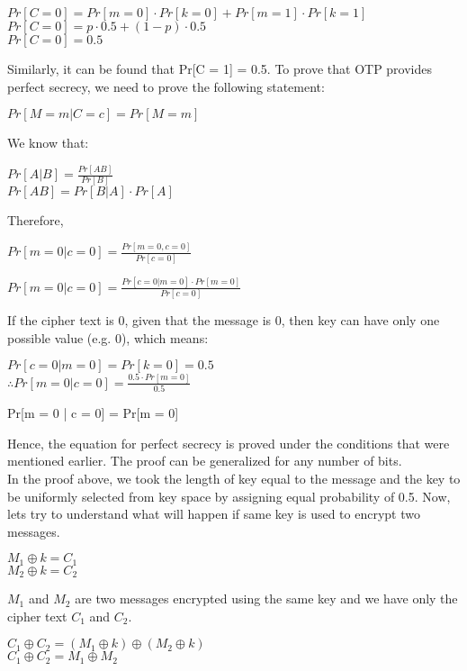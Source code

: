 \documentclass[11pt]{article}
\begin{document}
\begin{center}
    $Pr[C = 0] = Pr[m = 0] \cdot Pr[k = 0] + Pr[m = 1] \cdot Pr[k = 1]$\\
    $Pr[C = 0] = p \cdot 0.5 + (1 - p) \cdot 0.5$\\
    $Pr[C = 0] = 0.5$
\end{center}
Similarly, it can be found that Pr[C = 1] = 0.5. To prove that OTP provides perfect secrecy, we need to prove the following statement:
\begin{center}
    $Pr[M = m | C = c] = Pr[M = m]$
\end{center}
We know that:
\begin{center}
    $Pr[A|B] = \frac{Pr[AB]}{Pr[B]}$\\
    $Pr[AB] = Pr[B|A] \cdot Pr[A]$
\end{center}
Therefore, 
\begin{center}
    $Pr[m = 0 | c = 0] = \frac{Pr[m = 0, c = 0]}{Pr[c = 0]} $\\
\end{center}
\begin{center}
    $Pr[m = 0 | c = 0] = \frac{Pr[c = 0 | m = 0] \cdot Pr[m = 0]}{Pr[c = 0]} $
\end{center}
If the cipher text is 0, given that the message is 0, then key can have only one possible value (e.g. 0), which means:
\begin{center}
    $Pr[c = 0 | m = 0] = Pr[k = 0] = 0.5$\\
    $\therefore Pr[m = 0 | c = 0] = \frac{0.5 \cdot Pr[m = 0]}{0.5}$
\end{center}
\begin{center}
    Pr[m = 0 | c = 0] = Pr[m = 0]
\end{center}
Hence, the equation for perfect secrecy is proved under the conditions that were mentioned earlier. The proof can be generalized for any number of bits. \\
\newline
In the proof above, we took the length of key equal to the message and the key to be uniformly selected from key space by assigning equal probability of 0.5. Now, lets try to understand what will happen if same key is used to encrypt two messages.
\begin{center}
    $M_1 \oplus k = C_1$\\
    $M_2 \oplus k = C_2$
\end{center}
$M_1$ and $M_2$ are two messages encrypted using the same key and we have only the cipher text $C_1$ and $C_2$. 
\begin{center}
$C_1 \oplus C_2 = (M_1 \oplus k) \oplus (M_2 \oplus k)$\\
$C_1 \oplus C_2 = M_1 \oplus M_2$
\end{center}
\end{document}
